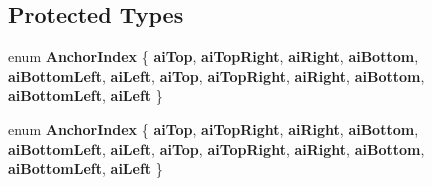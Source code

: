 \subsection*{Protected Types}
\begin{DoxyCompactItemize}
\item 
\mbox{\label{class_q_c_p_item_pixmap_a0ea7f65edb7395e02de521915f221174}} 
enum {\bfseries Anchor\+Index} \{ \newline
{\bfseries ai\+Top}, 
{\bfseries ai\+Top\+Right}, 
{\bfseries ai\+Right}, 
{\bfseries ai\+Bottom}, 
\newline
{\bfseries ai\+Bottom\+Left}, 
{\bfseries ai\+Left}, 
{\bfseries ai\+Top}, 
{\bfseries ai\+Top\+Right}, 
\newline
{\bfseries ai\+Right}, 
{\bfseries ai\+Bottom}, 
{\bfseries ai\+Bottom\+Left}, 
{\bfseries ai\+Left}
 \}
\item 
\mbox{\label{class_q_c_p_item_pixmap_a0ea7f65edb7395e02de521915f221174}} 
enum {\bfseries Anchor\+Index} \{ \newline
{\bfseries ai\+Top}, 
{\bfseries ai\+Top\+Right}, 
{\bfseries ai\+Right}, 
{\bfseries ai\+Bottom}, 
\newline
{\bfseries ai\+Bottom\+Left}, 
{\bfseries ai\+Left}, 
{\bfseries ai\+Top}, 
{\bfseries ai\+Top\+Right}, 
\newline
{\bfseries ai\+Right}, 
{\bfseries ai\+Bottom}, 
{\bfseries ai\+Bottom\+Left}, 
{\bfseries ai\+Left}
 \}
\end{DoxyCompactItemize}
